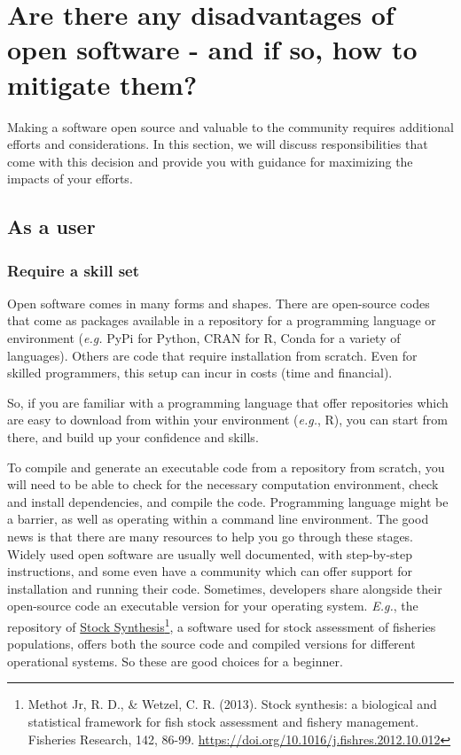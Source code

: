 \documentclass[
  letterpaper,
  DIV=11,
  numbers=noendperiod]{scrreport}
\begin{document}
\hypertarget{are-there-any-disadvantages-of-open-software---and-if-so-how-to-mitigate-them}{%
\section{Are there any disadvantages of open software - and if so, how
to mitigate
them?}\label{are-there-any-disadvantages-of-open-software---and-if-so-how-to-mitigate-them}}

Making a software open source and valuable to the community requires
additional efforts and considerations. In this section, we will discuss
responsibilities that come with this decision and provide you with
guidance for maximizing the impacts of your efforts.

\hypertarget{as-a-user}{%
\subsection{As a user}\label{as-a-user}}

\hypertarget{require-a-skill-set}{%
\subsubsection{Require a skill set}\label{require-a-skill-set}}

Open software comes in many forms and shapes. There are open-source
codes that come as packages available in a repository for a programming
language or environment (\emph{e.g.} PyPi for Python, CRAN for R, Conda
for a variety of languages). Others are code that require installation
from scratch. Even for skilled programmers, this setup can incur in
costs (time and financial).

So, if you are familiar with a programming language that offer
repositories which are easy to download from within your environment
(\emph{e.g.}, R), you can start from there, and build up your confidence
and skills.

To compile and generate an executable code from a repository from
scratch, you will need to be able to check for the necessary computation
environment, check and install dependencies, and compile the code.
Programming language might be a barrier, as well as operating within a
command line environment. The good news is that there are many resources
to help you go through these stages. Widely used open software are
usually well documented, with step-by-step instructions, and some even
have a community which can offer support for installation and running
their code. Sometimes, developers share alongside their open-source code
an executable version for your operating system. \emph{E.g.}, the
repository of
\href{https://github.com/nmfs-stock-synthesis/stock-synthesis/releases}{Stock
Synthesis}\footnote{Methot Jr, R. D., \& Wetzel, C. R. (2013). Stock
  synthesis: a biological and statistical framework for fish stock
  assessment and fishery management. Fisheries Research, 142, 86-99.
  \url{https://doi.org/10.1016/j.fishres.2012.10.012}}, a software used
for stock assessment of fisheries populations, offers both the source
code and compiled versions for different operational systems. So these
are good choices for a beginner.
\end{document}
